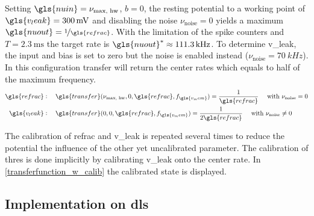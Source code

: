 Setting $\gls{nuin} = \nu_\text{max, hw}$, $b=0$, the resting potential to a working point of $\gls{v_leak} = \SI{300}{\milli \V}$ and disabling the noise $\nu_\text{noise} = 0$ yields a maximum $\gls{nuout} = \nicefrac{1}{\gls{refrac}}$. With the limitation of the spike counters and $T = \SI{2.3}{\milli \s} $ the target rate is $\gls{nuout}^* \approx \SI{111.3}{\kilo \Hz}$. To determine \gls{v_leak}, the input and bias is set to zero but the noise is enabled instead ($\nu_\text{noise} = \SI{70}{kHz}$). In this configuration \gls{transfer} will return the center rates which equals to half of the maximum frequency.
\begin{align*}\label{calibration_config}
\gls{refrac}&:\quad \gls{transfer}(\nu_\text{max, hw}, 0, \gls{refrac}, f_{\gls{v_mem}}) = \frac{1}{\gls{refrac}} \quad \text{ with } \nu_\text{noise} = 0\\
\gls{v_leak}&:\quad \gls{transfer}(0, 0, \gls{refrac}, f_{\gls{v_mem}}) = \frac{1}{2\gls{refrac}} \quad \text{ with } \nu_\text{noise} \neq 0
\end{align*}

The calibration of \gls{refrac} and \gls{v_leak} is repeated several times to reduce the potential the influence of the other yet uncalibrated parameter. The calibration of \gls{thres} is done implicitly by calibrating \gls{v_leak} onto the center rate. In \cref{transferfunction_w_calib} the calibrated state is displayed. 
%
%




\subsection{Implementation on \gls{dls}}


